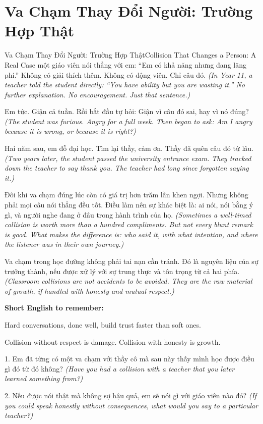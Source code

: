 \section{Va Chạm Thay Đổi Người: Trường Hợp Thật}
\begin{truyen}{Va Chạm Thay Đổi Người: Trường Hợp Thật}{Collision That Changes a Person: A Real Case}
 một giáo viên nói thẳng với em: ``Em có khả năng nhưng đang lãng phí.'' Không có giải thích thêm. Không có động viên. Chỉ câu đó.
\textit{(In Year 11, a teacher told the student directly: ``You have ability but you are wasting it.'' No further explanation. No encouragement. Just that sentence.)}

Em tức. Giận cả tuần. Rồi bắt đầu tự hỏi: Giận vì câu đó sai, hay vì nó đúng?
\textit{(The student was furious. Angry for a full week. Then began to ask: Am I angry because it is wrong, or because it is right?)}

Hai năm sau, em đỗ đại học. Tìm lại thầy, cảm ơn. Thầy đã quên câu đó từ lâu.
\textit{(Two years later, the student passed the university entrance exam. They tracked down the teacher to say thank you. The teacher had long since forgotten saying it.)}

\begin{baihoc}
Đôi khi va chạm đúng lúc còn có giá trị hơn trăm lần khen ngợi. Nhưng không phải mọi câu nói thẳng đều tốt. Điều làm nên sự khác biệt là: ai nói, nói bằng ý gì, và người nghe đang ở đâu trong hành trình của họ.
\textit{(Sometimes a well-timed collision is worth more than a hundred compliments. But not every blunt remark is good. What makes the difference is: who said it, with what intention, and where the listener was in their own journey.)}
\end{baihoc}
\end{truyen}

\begin{baihoc}
Va chạm trong học đường không phải tai nạn cần tránh. Đó là nguyên liệu của sự trưởng thành, nếu được xử lý với sự trung thực và tôn trọng từ cả hai phía.
\textit{(Classroom collisions are not accidents to be avoided. They are the raw material of growth, if handled with honesty and mutual respect.)}
\end{baihoc}

\begin{ghinhoanh}
\textbf{Short English to remember:}

Hard conversations, done well, build trust faster than soft ones.

Collision without respect is damage. Collision with honesty is growth.
\end{ghinhoanh}

\begin{tuhocnhanh}
1. Em đã từng có một va chạm với thầy cô mà sau này thấy mình học được điều gì đó từ đó không? \textit{(Have you had a collision with a teacher that you later learned something from?)}

2. Nếu được nói thật mà không sợ hậu quả, em sẽ nói gì với giáo viên nào đó? \textit{(If you could speak honestly without consequences, what would you say to a particular teacher?)}
\end{tuhocnhanh}

\ngancach
